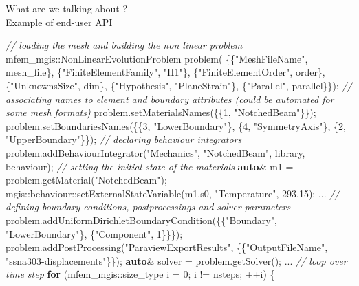 \documentclass{beamer}
\newcommand{\CommentTok}[1]{\textcolor[rgb]{0.38,0.63,0.69}{\textit{#1}}}
\newcommand{\ControlFlowTok}[1]{\textcolor[rgb]{0.00,0.44,0.13}{\textbf{#1}}}
\newcommand{\DataTypeTok}[1]{\textcolor[rgb]{0.56,0.13,0.00}{#1}}
\newcommand{\DecValTok}[1]{\textcolor[rgb]{0.25,0.63,0.44}{#1}}
\newcommand{\FloatTok}[1]{\textcolor[rgb]{0.25,0.63,0.44}{#1}}
\newcommand{\KeywordTok}[1]{\textcolor[rgb]{0.00,0.44,0.13}{\textbf{#1}}}
\newcommand{\NormalTok}[1]{#1}
\newcommand{\StringTok}[1]{\textcolor[rgb]{0.25,0.44,0.63}{#1}}
\begin{document}
\begin{frame}[fragile]{What are we talking about ? \\
Example of end-user API}
  \begin{center}
      \begin{minipage}{\linewidth}
      \tiny
      \begin{Highlighting}[]
        \CommentTok{// loading the mesh and building the non linear problem}
        \NormalTok{mfem_mgis::NonLinearEvolutionProblem problem(}
        \NormalTok{    \{\{}\StringTok{"MeshFileName"}\NormalTok{, mesh_file\},  \{}\StringTok{"FiniteElementFamily"}\NormalTok{, }\StringTok{"H1"}\NormalTok{\},}
        \NormalTok{     \{}\StringTok{"FiniteElementOrder"}\NormalTok{, order\}, \{}\StringTok{"UnknownsSize"}\NormalTok{, dim\},}
        \NormalTok{     \{}\StringTok{"Hypothesis"}\NormalTok{, }\StringTok{"PlaneStrain"}\NormalTok{\}, \{}\StringTok{"Parallel"}\NormalTok{, parallel\}\});}
        \CommentTok{// associating names to element and boundary attributes (could be automated for some mesh formats)}
        \NormalTok{problem.setMaterialsNames(\{\{1, }\StringTok{"NotchedBeam"}\NormalTok{\}\});}
        \NormalTok{problem.setBoundariesNames(\{\{3, }\StringTok{"LowerBoundary"}\NormalTok{\}, \{4, }\StringTok{"SymmetryAxis"}\NormalTok{\}, \{2, }\StringTok{"UpperBoundary"}\NormalTok{\}\});}
        \CommentTok{// declaring behaviour integrators}
        \NormalTok{problem.}\NormalTok{addBehaviourIntegrator}\NormalTok{(}\StringTok{"Mechanics"}\NormalTok{, }\StringTok{"NotchedBeam"}\NormalTok{, library, behaviour);}
        \CommentTok{// setting the initial state of the materials}
        \KeywordTok{auto}\NormalTok{\& m1 = problem.getMaterial(}\StringTok{"NotchedBeam"}\NormalTok{);}
        \NormalTok{mgis::behaviour::setExternalStateVariable(m1.s0, }\StringTok{"Temperature"}\NormalTok{, }\FloatTok{293.15}\NormalTok{);}
        \NormalTok{...}
        \CommentTok{// defining boundary conditions, postprocessings and solver parameters}
        \NormalTok{problem.addUniformDirichletBoundaryCondition(\{\{}\StringTok{"Boundary"}\NormalTok{, }\StringTok{"LowerBoundary"}\NormalTok{\}, \{}\StringTok{"Component"}\NormalTok{, 1\}\}\});}
        \NormalTok{problem.addPostProcessing(}\StringTok{"ParaviewExportResults"}\NormalTok{, \{\{}\StringTok{"OutputFileName"}\NormalTok{, }\StringTok{"ssna303-displacements"}\NormalTok{\}\})};
        \KeywordTok{auto}\NormalTok{\& solver = problem.getSolver();}
        \NormalTok{...}
        \CommentTok{// loop over time step}
        \ControlFlowTok{for}\NormalTok{ (mfem\_mgis::}\DataTypeTok{size\_type}\NormalTok{ i = }\DecValTok{0}\NormalTok{; i != nsteps; ++i) \{}

\end{Highlighting}
\end{minipage}
\end{center}
\end{frame}
\end{document}
